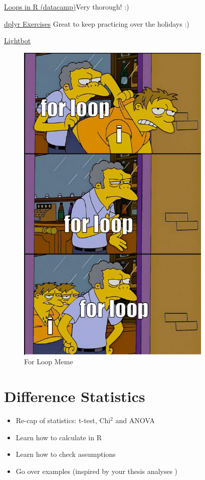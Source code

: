 \documentclass[
]{book}
\providecommand{\tightlist}{%
  \setlength{\itemsep}{0pt}\setlength{\parskip}{0pt}}
\begin{document}
\href{https://www.datacamp.com/tutorial/tutorial-on-loops-in-r}{Loops in R (datacamp)}Very thorough! :)

\href{https://sjspielman.github.io/datascience_for_biologists/exercises/dplyr.html}{dplyr Exercises} Great to keep practicing over the holidays :)

\href{https://lightbot.com/hour-of-code.html}{Lightbot}

\begin{figure}
\centering
\includegraphics[width=\textwidth,height=6.25in]{./img/forbeep.png}
\caption{For Loop Meme}
\end{figure}

\chapter{Difference Statistics}\label{difference-statistics}

\begin{itemize}
\tightlist
\item
  Re-cap of statistics: t-test, Chi\(^2\) and ANOVA
\item
  Learn how to calculate in R
\item
  Learn how to check assumptions
\item
  Go over examples (inspired by your thesis analyses )
\end{itemize}
\end{document}

